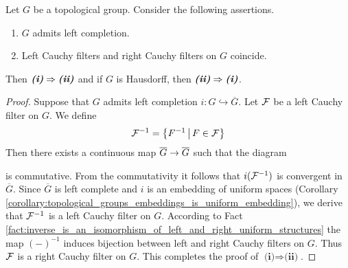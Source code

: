 \documentclass[10pt]{amsart}
\begin{document}
\begin{theorem}\label{theorem:criterion_for_existence_of_one_sided_completions}
	Let $G$ be a topological group. Consider the following assertions.
	\begin{enumerate}[label=\emph{\textbf{(\roman*)}}, leftmargin=*]
		\item $G$ admits left completion.
		\item Left Cauchy filters and right Cauchy filters on $G$ coincide.
	\end{enumerate}
	Then $\emph{\textbf{(i)}} \Rightarrow \emph{\textbf{(ii)}}$ and if $G$ is Hausdorff, then $\emph{\textbf{(ii)}} \Rightarrow \emph{\textbf{(i)}}$.
\end{theorem}
\begin{proof}
	Suppose that $G$ admits left completion $i:G \hookrightarrow \overline{G}$. Let ${\mathcal F}$ be a left Cauchy filter on $G$. We define
	$${\mathcal F}^{-1} = \big\{F^{-1}\,\big|\,F\in {\mathcal F}\big\}$$
	Then there exists a continuous map $\overline{G}\rightarrow \overline{G}$ such that the diagram
	\begin{center}
	\end{center}
	is commutative. From the commutativity it follows that $i({\mathcal F}^{-1})$ is convergent in $\overline{G}$. Since $\overline{G}$ is left complete and $i$ is an embedding of uniform spaces (Corollary \ref{corollary:topological_groups_embeddings_is_uniform_embedding}), we derive that ${\mathcal F}^{-1}$ is a left Cauchy filter on $G$. According to Fact \ref{fact:inverse_is_an_isomorphism_of_left_and_right_uniform_structures} the map $(-)^{-1}$ induces bijection between left and right Cauchy filters on $G$. Thus ${\mathcal F}$ is a right Cauchy filter on $G$. This completes the proof of $\textbf{(i)}\Rightarrow \textbf{(ii)}$.


\end{proof}
\end{document}
